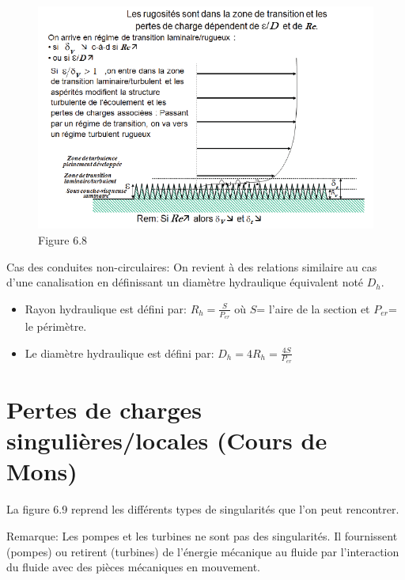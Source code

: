 \begin{figure}[H]
\begin{center}
\includegraphics[scale=0.40]{ch6/69.png}
\caption*{Figure 6.8}
\end{center}
\end{figure}


Cas des conduites non-circulaires:  On revient à des relations similaire au cas d'une canalisation en définissant un diamètre hydraulique \og  équivalent\fg{} noté $D_h$.
\begin{itemize}
\item Rayon hydraulique est défini par: $R_h=\frac{S}{P_{er}}$ où $S$= l'aire de la section et $P_{er}$= le périmètre.
\item Le diamètre hydraulique est défini par: $D_h=4R_h=\frac{4S}{P_{er}}$
\end{itemize}

\section{Pertes de charges singulières/locales (Cours de Mons)}

La figure 6.9 reprend les différents types de singularités que l'on peut rencontrer.

Remarque: Les pompes et les turbines ne sont pas des singularités. Il fournissent (pompes) ou retirent (turbines) de l'énergie mécanique au fluide par l'interaction du fluide avec des pièces mécaniques en mouvement.
\\

